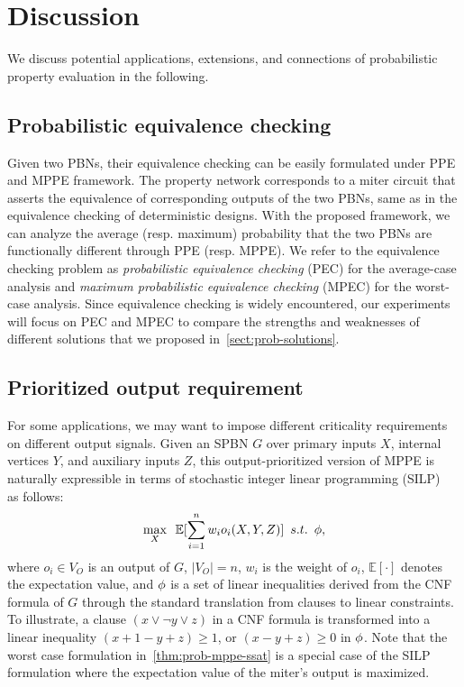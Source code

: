 \section{Discussion}
\label{sect:prob-discussion}

We discuss potential applications, extensions, and connections of probabilistic property evaluation in the following.

\subsection{Probabilistic equivalence checking}
Given two PBNs, their equivalence checking can be easily formulated under PPE and MPPE framework.
The property network corresponds to a miter circuit
that asserts the equivalence of corresponding outputs of the two PBNs,
same as in the equivalence checking of deterministic designs.
With the proposed framework,
we can analyze the average (resp. maximum) probability
that the two PBNs are functionally different through PPE (resp. MPPE).
We refer to the equivalence checking problem as
\textit{probabilistic equivalence checking} (PEC) for the average-case analysis and
\textit{maximum probabilistic equivalence checking} (MPEC) for the worst-case analysis.
Since equivalence checking is widely encountered,
our experiments will focus on PEC and MPEC to compare the strengths and weaknesses of different solutions
that we proposed in~\cref{sect:prob-solutions}.

\subsection{Prioritized output requirement}
For some applications,
we may want to impose different criticality requirements on different output signals.
Given an SPBN $G$ over
primary inputs $X$,
internal vertices $Y$,
and auxiliary inputs $Z$,
this output-prioritized version of MPPE is naturally expressible
in terms of stochastic integer linear programming (SILP)~\cite{Schultz2003} as follows:
\begin{align*}
    \max_X \enskip \mathbb{E}[\sum_{i=1}^n w_i o_i(X,Y,Z)] \enskip s.t. \enskip \phi,
\end{align*}
where $o_i \in V_O$ is an output of $G$, $|V_O|=n$,
$w_i$ is the weight of $o_i$,
$\mathbb{E}[\cdot]$ denotes the expectation value,
and $\phi$ is a set of linear inequalities derived from the CNF formula of $G$
through the standard translation from clauses to linear constraints.
To illustrate, a clause $(x \lor \lnot y \lor z)$ in a CNF formula is transformed into
a linear inequality $(x+1-y+z)\geq 1$,
or $(x-y+z)\geq 0$ in $\phi$.
Note that the worst case formulation in~\cref{thm:prob-mppe-ssat} is a special case of
the SILP formulation where the expectation value of the miter's output is maximized.


